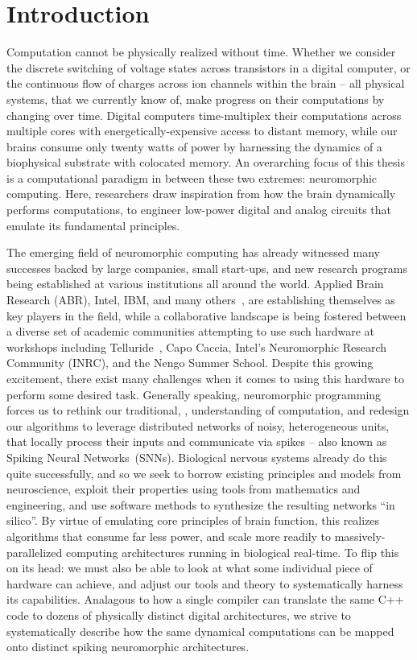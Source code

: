 \chapter{Introduction}

Computation cannot be physically realized without time.
Whether we consider the discrete switching of voltage states across transistors in a
digital computer,
or the continuous flow of charges across ion channels within the brain -- 
all physical systems, that we currently know of, make progress on their computations
by changing over time.
Digital computers time-multiplex their computations across multiple cores with energetically-expensive access to distant memory, while our brains consume only twenty watts of power by harnessing the dynamics of a biophysical substrate with colocated memory.
An overarching focus of this thesis is a computational paradigm
in between these two extremes: neuromorphic computing.
Here, researchers draw inspiration from how the
brain dynamically performs computations,
to engineer low-power digital and analog circuits that emulate its fundamental principles.

The emerging field of neuromorphic computing has already
witnessed many successes backed by large companies, small start-ups, and new research
programs being established at various institutions all around the world.
Applied Brain Research (ABR), Intel, IBM, and many others~\citep{marketreport2018}, are establishing themselves as key players in the field, while a collaborative landscape is being fostered between a diverse set of academic communities attempting to use such hardware at workshops including Telluride~\citep{cohen2001report}, Capo Caccia, Intel's Neuromorphic Research Community (INRC), and the Nengo Summer School.
Despite this growing excitement, there exist many challenges when it comes to using
this hardware to perform some desired task.
Generally speaking, neuromorphic programming forces us to rethink our traditional,
\citet{von1958}, understanding of computation, and redesign our algorithms to leverage distributed networks of noisy, heterogeneous units, that locally process their inputs and communicate via spikes -- also known as Spiking Neural Networks~(SNNs).
Biological nervous systems already do this quite successfully, and so we seek to borrow existing
principles and models from neuroscience, exploit their properties using tools from mathematics and engineering,
and use software methods to synthesize the resulting networks ``in silico''.
By virtue of emulating core principles of brain function, this realizes algorithms that consume far less power, and scale more readily to massively-parallelized computing architectures running in biological real-time.
To flip this on its head: we must also be able to look at what some individual piece of hardware can achieve,
and adjust our tools and theory to systematically harness its capabilities.
Analagous to how a single compiler can translate the same C++ code
to dozens of physically distinct digital architectures, we strive to systematically describe
how the same dynamical computations can be mapped onto distinct spiking neuromorphic architectures.

